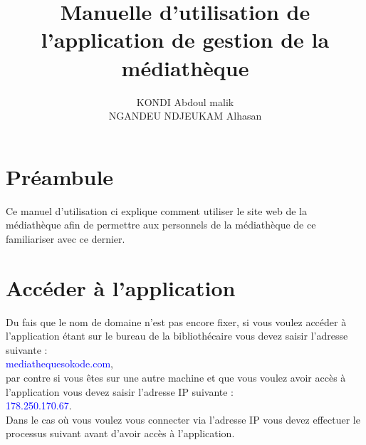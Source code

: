 \documentclass[12pt,a4paper]{article}
\author{KONDI Abdoul malik \\ NGANDEU NDJEUKAM Alhasan}
\title{Manuelle d'utilisation de l'application de gestion de la médiathèque}
\begin{document}
\maketitle
\tableofcontents
\newpage

\section{Préambule}
Ce manuel d'utilisation ci explique comment utiliser le site web de la médiathèque afin
de permettre aux personnels de la médiathèque de ce familiariser avec ce dernier.


\newpage
\section{Accéder à l'application}
Du fais que le nom de domaine n'est pas encore fixer, si vous voulez accéder à l'application étant sur le bureau de la bibliothécaire vous devez saisir l'adresse suivante : \\
\textcolor{blue}{mediathequesokode.com}, \\ par contre si vous êtes sur une autre machine et que vous voulez avoir accès à l'application vous devez saisir l'adresse IP suivante : \\
\textcolor{blue}{178.250.170.67}.\\
Dans le cas où vous voulez vous connecter via l'adresse IP vous devez effectuer le processus suivant avant d'avoir accès à l'application.
\end{document}
